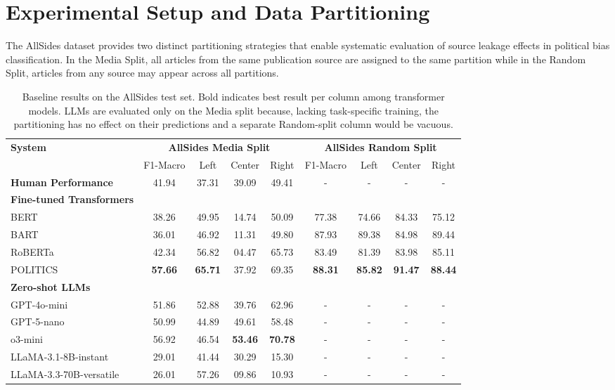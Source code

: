 
\section{Experimental Setup and Data Partitioning}
\label{sec:experimental-setup}

The AllSides dataset provides two distinct partitioning strategies that enable systematic evaluation of source leakage effects in political bias classification. In the Media Split, all articles from the same publication source are assigned to the same partition while in the Random Split, articles from any source may appear across all partitions.

\begin{table}
\centering
\footnotesize
\begin{tabular}{@{}l|cccc|cccc@{}}
\toprule
\textbf{System} & \multicolumn{4}{c|}{\textbf{AllSides Media Split}} & \multicolumn{4}{c}{\textbf{AllSides Random Split}} \\
 & F1-Macro & Left & Center & Right & F1-Macro & Left & Center & Right \\
 \midrule
\textbf{Human Performance} & 41.94 & 37.31 & 39.09 & 49.41 & - & - & - & -\\
 \midrule
\textbf{Fine-tuned Transformers} & & & & & & & & \\
BERT & 38.26 & 49.95 & 14.74 & 50.09 & 77.38 & 74.66 & 84.33 & 75.12 \\
BART & 36.01 & 46.92 & 11.31 & 49.80  & 87.93 & 89.38 & 84.98 & 89.44 \\
RoBERTa & 42.34 & 56.82 & 04.47 & 65.73  & 83.49 & 81.39 & 83.98 & 85.11 \\
POLITICS & \textbf{57.66} & \textbf{65.71} & 37.92 & 69.35 &  \textbf{88.31} & \textbf{85.82} & \textbf{91.47} & \textbf{88.44} \\
\midrule
\textbf{Zero-shot LLMs} & & & & & & & & \\
GPT-4o-mini & 51.86 & 52.88 & 39.76 & 62.96 & - & - & - & -  \\
GPT-5-nano & 50.99 & 44.89 & 49.61 & 58.48 & - & - & - & - \\
o3-mini & 56.92 & 46.54 & \textbf{53.46} & \textbf{70.78} & - & - & - & - \\
LLaMA-3.1-8B-instant & 29.01 & 41.44 & 30.29 & 15.30 & - & - & - & - \\
LLaMA-3.3-70B-versatile & 26.01 & 57.26 & 09.86 & 10.93  & - & - & - & - \\
\bottomrule
\end{tabular}
\caption{Baseline results on the AllSides test set. Bold indicates best result per column among transformer models. LLMs are evaluated only on the Media split because, lacking task-specific training, the partitioning has no effect on their predictions and a separate Random-split column would be vacuous.}
\label{tab:main_baseline}
\end{table}

